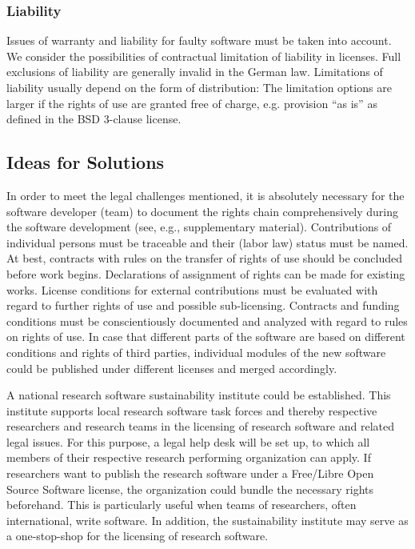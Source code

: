 \documentclass[a4paper,num-refs,numbers,sort&compress]{de-rse}
\begin{document}
\subsubsection{Liability}
Issues of warranty and liability for faulty software must be taken into account. We consider the possibilities of contractual limitation of liability in licenses. Full exclusions of liability are generally invalid in the German law. Limitations of liability usually depend on the form of distribution: The limitation options are larger if the rights of use are granted free of charge, e.g. provision ``as is'' as defined in the BSD 3-clause license.

\subsection{Ideas for Solutions}
In order to meet the legal challenges mentioned, it is absolutely necessary for the software developer (team) to document the rights chain comprehensively during the software development (see, e.g., supplementary material). Contributions of individual persons must be traceable and their (labor law) status must be named. At best, contracts with rules on the transfer of rights of use should be concluded before work begins. Declarations of assignment of rights can be made for existing works. License conditions for external contributions must be evaluated with regard to further rights of use and possible sub-licensing. Contracts and funding conditions must be conscientiously documented and analyzed with regard to rules on rights of use. In case that different parts of the software are based on different conditions and rights of third parties, individual modules of the new software could be published under different licenses and merged accordingly.

A national research software sustainability institute could be established. This institute supports local research software task forces and thereby respective researchers and research teams in the licensing of research software and related legal issues. For this purpose, a legal help desk will be set up, to which all members of their respective research performing organization can apply. If researchers want to publish the research software under a Free/Libre Open Source Software license, the organization could bundle the necessary rights beforehand. This is particularly useful when teams of researchers, often international, write software. In addition, the sustainability institute may serve as a one-stop-shop for the licensing of research software.
\end{document}
